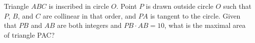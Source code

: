 Triangle $ABC$ is inscribed in circle $O$. Point $P$ is drawn outside circle $O$ such that $P$, $B$, and $C$ are collinear in that order, and $PA$ is tangent to the circle. Given that $PB$ and $AB$ are both integers and $PB \cdot  AB = 10$, what is the maximal area of triangle PAC?

